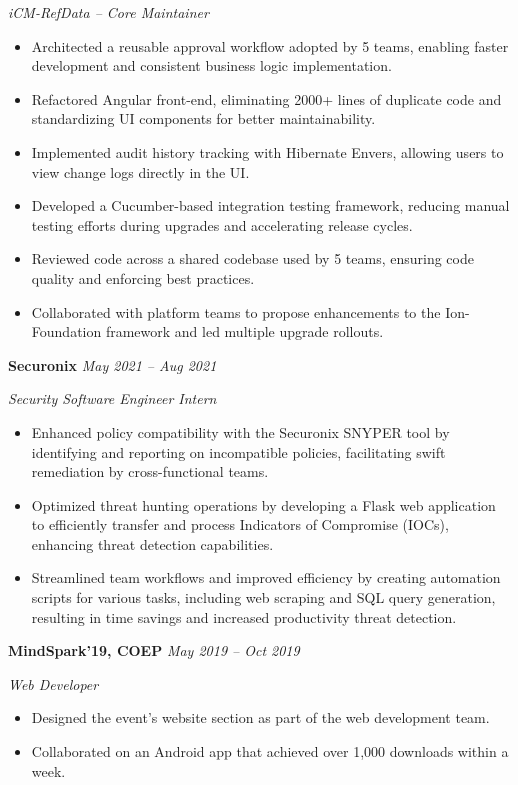 \documentclass[a4paper,10pt]{article}
\newcommand{\cvHeaderTwo}[2]{%
  \vspace{0.8em}%
  \noindent\textbf{\normalsize #1} \hfill \textit{#2}\par%
}
\newcommand{\cvHeaderThree}[1]{%
  \noindent\textit{#1}%
}
\newenvironment{cvItemList}{%
  \begin{itemize}%
    \setlength{\itemsep}{0.1em}%
    \setlength{\topsep}{0em}%
    \setlength{\partopsep}{0em}%
    \setlength{\parsep}{0em}%
    \setlength{\parskip}{0em}%
}{%
  \end{itemize}%
}
\begin{document}
\cvHeaderThree{iCM-RefData – Core Maintainer}
\begin{cvItemList}
  \item Architected a reusable approval workflow adopted by 5 teams, enabling faster development and consistent business logic implementation.
  \item Refactored Angular front-end, eliminating 2000+ lines of duplicate code and standardizing UI components for better maintainability.
  \item Implemented audit history tracking with Hibernate Envers, allowing users to view change logs directly in the UI.
  \item Developed a Cucumber-based integration testing framework, reducing manual testing efforts during upgrades and accelerating release cycles.
  \item Reviewed code across a shared codebase used by 5 teams, ensuring code quality and enforcing best practices.
  \item Collaborated with platform teams to propose enhancements to the Ion-Foundation framework and led multiple upgrade rollouts.
\end{cvItemList}

\cvHeaderTwo{Securonix}{May 2021 -- Aug 2021}

\cvHeaderThree{Security Software Engineer Intern}
\begin{cvItemList}
\item Enhanced policy compatibility with the Securonix SNYPER tool by identifying and reporting on incompatible policies, facilitating swift remediation by cross-functional teams.
\item Optimized threat hunting operations by developing a Flask web application to efficiently transfer and process Indicators of Compromise (IOCs), enhancing threat detection capabilities.
\item Streamlined team workflows and improved efficiency by creating automation scripts for various tasks, including web scraping and SQL query generation, resulting in time savings and increased productivity threat detection.
\end{cvItemList}

\cvHeaderTwo{MindSpark'19, COEP}{May 2019 -- Oct 2019}

\cvHeaderThree{Web Developer}
\begin{cvItemList}
\item Designed the event’s website section as part of the web development team.
\item Collaborated on an Android app that achieved over 1,000 downloads within a week.
\end{cvItemList}
\end{document}
